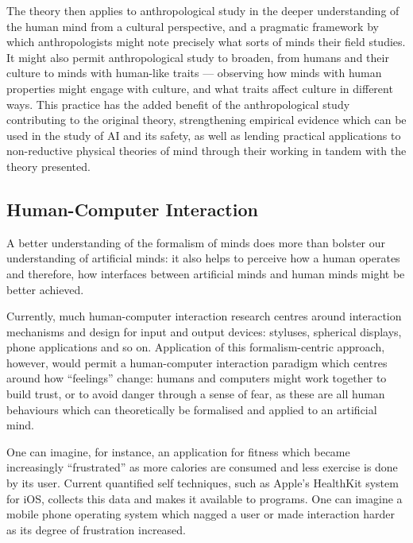 The theory then applies to anthropological study in the deeper understanding of the human mind from a cultural perspective, and a pragmatic framework by which anthropologists might note precisely what sorts of minds their field studies. It might also permit anthropological study to broaden, from humans and their culture to minds with human-like traits --- observing how minds with human properties might engage with culture, and what traits affect culture in different ways. This practice has the added benefit of the anthropological study contributing to the original theory, strengthening empirical evidence which can be used in the study of AI and its safety, as well as lending practical applications to non-reductive physical theories of mind through their working in tandem with the theory presented.\par

\subsection{Human-Computer Interaction} %
A better understanding of the formalism of minds does more than bolster our understanding of artificial minds: it also helps to perceive how a human operates and therefore, how interfaces between artificial minds and human minds might be better achieved.\par

Currently, much human-computer interaction research centres around interaction mechanisms and design for input and output devices: styluses, spherical displays, phone applications and so on. Application of this formalism-centric approach, however, would permit a human-computer interaction paradigm which centres around how ``feelings'' change: humans and computers might work together to build trust, or to avoid danger through a sense of fear, as these are all human behaviours which can theoretically be formalised and applied to an artificial mind.\par

One can imagine, for instance, an application for fitness which became increasingly ``frustrated'' as more calories are consumed and less exercise is done by its user. Current quantified self techniques, such as Apple's HealthKit system for iOS, collects this data and makes it available to programs. One can imagine a mobile phone operating system which nagged a user or made interaction harder as its degree of frustration increased.\par

